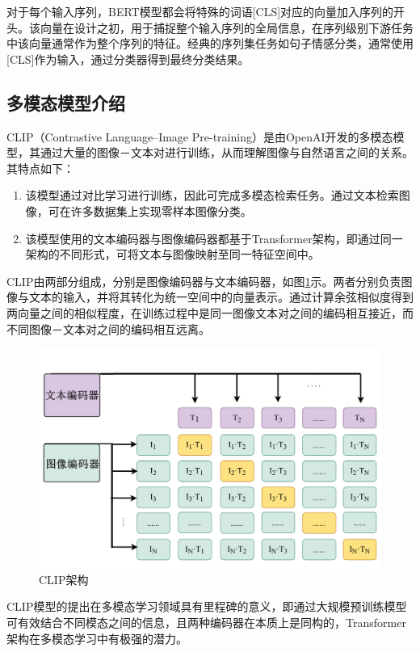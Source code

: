 对于每个输入序列，BERT模型都会将特殊的词语[CLS]对应的向量加入序列的开头。该向量在设计之初，用于捕捉整个输入序列的全局信息，在序列级别下游任务中该向量通常作为整个序列的特征。经典的序列集任务如句子情感分类，通常使用[CLS]作为输入，通过分类器得到最终分类结果。

\subsection{多模态模型介绍}
CLIP（Contrastive Language–Image Pre-training）是由OpenAI开发的多模态模型，其通过大量的图像－文本对进行训练，从而理解图像与自然语言之间的关系。其特点如下：
\begin{enumerate}
    \item 该模型通过对比学习进行训练，因此可完成多模态检索任务。通过文本检索图像，可在许多数据集上实现零样本图像分类。
    \item 该模型使用的文本编码器与图像编码器都基于Transformer架构，即通过同一架构的不同形式，可将文本与图像映射至同一特征空间中。
\end{enumerate}

CLIP由两部分组成，分别是图像编码器与文本编码器，如图\ref{fig:clip_struct}示。两者分别负责图像与文本的输入，并将其转化为统一空间中的向量表示。通过计算余弦相似度得到两向量之间的相似程度，在训练过程中是同一图像文本对之间的编码相互接近，而不同图像－文本对之间的编码相互远离。

\begin{figure}[htbp]
    \centering
    \includegraphics[width=1\linewidth]{img/multimodal/clip-overview.pdf}
    \caption{CLIP架构}
    \label{fig:clip_struct}
\end{figure}

CLIP模型的提出在多模态学习领域具有里程碑的意义，即通过大规模预训练模型可有效结合不同模态之间的信息，且两种编码器在本质上是同构的，Transformer架构在多模态学习中有极强的潜力。

